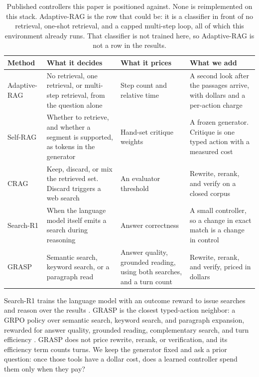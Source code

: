 \documentclass[letterpaper]{article} %
\begin{document}
\begin{table}[t]
\centering
\small
\setlength{\tabcolsep}{4pt}
\begin{tabular}{lp{3.6cm}p{3.4cm}p{4.6cm}}
\toprule
Method & What it decides & What it prices & What we add \\
\midrule
Adaptive-RAG \cite{jeong2024adaptive} &
No retrieval, one retrieval, or multi-step retrieval, from the question alone &
Step count and relative time &
A second look after the passages arrive, with dollars and a per-action charge \\
Self-RAG \cite{asai2024selfrag} &
Whether to retrieve, and whether a segment is supported, as tokens in the generator &
Hand-set critique weights &
A frozen generator. Critique is one typed action with a measured cost \\
CRAG \cite{yan2024crag} &
Keep, discard, or mix the retrieved set. Discard triggers a web search &
An evaluator threshold &
Rewrite, rerank, and verify on a closed corpus \\
Search-R1 \cite{jin2025searchr1} &
When the language model itself emits a search during reasoning &
Answer correctness &
A small controller, so a change in exact match is a change in control \\
GRASP \cite{gandhi2026grasp} &
Semantic search, keyword search, or a paragraph read &
Answer quality, grounded reading, using both searches, and a turn count &
Rewrite, rerank, and verify, priced in dollars \\
\bottomrule
\end{tabular}
\caption{Published controllers this paper is positioned against. None is reimplemented on this stack. Adaptive-RAG is the row that could be: it is a classifier in front of no retrieval, one-shot retrieval, and a capped multi-step loop, all of which this environment already runs. That classifier is not trained here, so Adaptive-RAG is not a row in the results.}
\label{tab:related}
\end{table}

Search-R1 trains the language model with an outcome reward to issue searches and reason over the results \cite{jin2025searchr1}. GRASP is the closest typed-action neighbor: a GRPO policy over semantic search, keyword search, and paragraph expansion, rewarded for answer quality, grounded reading, complementary search, and turn efficiency \cite{gandhi2026grasp}. GRASP does not price rewrite, rerank, or verification, and its efficiency term counts turns. We keep the generator fixed and ask a prior question: once those tools have a dollar cost, does a learned controller spend them only when they pay?
\end{document}
